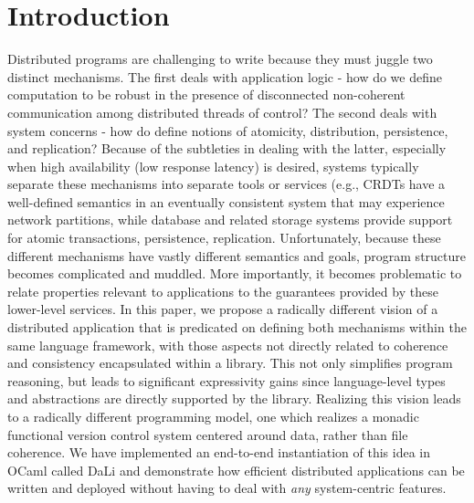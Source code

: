 \section{Introduction}

Distributed programs are challenging to write because they must juggle
two distinct mechanisms.  The first deals with application logic - how
do we define computation to be robust in the presence of disconnected
non-coherent communication among distributed threads of control?  The
second deals with system concerns - how do define notions of
atomicity, distribution, persistence, and replication?  Because of the
subtleties in dealing with the latter, especially when high
availability (low response latency) is desired, systems typically
separate these mechanisms into separate tools or services (e.g., CRDTs
have a well-defined semantics in an eventually consistent system that
may experience network partitions, while database and related storage
systems provide support for atomic transactions, persistence,
replication.  Unfortunately, because these different mechanisms have
vastly different semantics and goals, program structure becomes
complicated and muddled.  More importantly, it becomes problematic to
relate properties relevant to applications to the guarantees provided
by these lower-level services.  In this paper, we propose a radically
different vision of a distributed application that is predicated on
defining both mechanisms within the same language framework, with
those aspects not directly related to coherence and consistency
encapsulated within a library.  This not only simplifies program
reasoning, but leads to significant expressivity gains since
language-level types and abstractions are directly supported by the
library.  Realizing this vision leads to a radically different
programming model, one which realizes a monadic functional version
control system centered around data, rather than file coherence.  We
have implemented an end-to-end instantiation of this idea in OCaml
called DaLi and demonstrate how efficient distributed applications can
be written and deployed without having to deal with \emph{any}
system-centric features.

